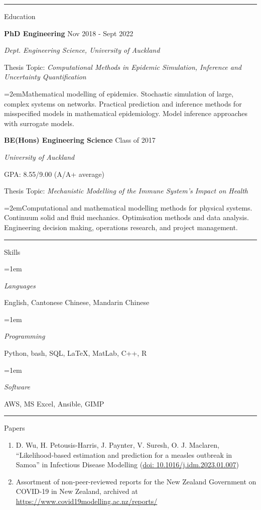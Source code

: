 \documentclass[paper=a4paper,fontsize=11pt]{scrartcl}
\newcommand{\pagerule}[1][2pt]{\noindent\rule{\textwidth}{#1}}
\newcommand{\usingfont}[2]{#1 #2 \par \normalsize \normalfont}
\newcommand{\sectionheader}[1]{\pagerule \vspace{0.05ex} \usingfont{\usefont{T1}{phv}{m}{v} \Large}{\noindent \hspace{-0.5em} #1} \vspace{0.75ex}}
\newlength{\spacebox}
\newcommand{\indented}[1][2em]{\noindent\hangindent=#1\hangafter=0}
\begin{document}
\sectionheader{Education}
\noindent \textbf{PhD Engineering} \hfill
Nov 2018 - Sept 2022 \par
\noindent \textit{Dept. Engineering Science, University of
Auckland} \par
\small Thesis Topic: \emph{Computational Methods in Epidemic Simulation,
Inference and Uncertainty Quantification} \par
\indented \small Mathematical modelling of epidemics. Stochastic
simulation of large, complex systems on networks. Practical prediction
and inference methods for misspecified models in mathematical
epidemiology. Model inference approaches with surrogate models.
\normalsize \par\par
\noindent \textbf{BE(Hons) Engineering Science} \hfill
Class of 2017 \par
\noindent \textit{University of Auckland} \par
\small GPA: 8.55/9.00 (A/A+ average) \par
\small Thesis Topic: \emph{Mechanistic Modelling of the Immune System's
Impact on Health} \par
\indented \small Computational and mathematical modelling methods for
physical systems. Continuum solid and fluid mechanics. Optimisation
methods and data analysis. Engineering decision making, operations
research, and project management.
\normalsize \par\par

\sectionheader{Skills}
\indented[1em] \parbox{\spacebox}{\textit{Languages}} 
\hspace{1.5em} English, Cantonese Chinese, Mandarin Chinese
\par
\indented[1em] \parbox{\spacebox}{\textit{Programming}} 
\hspace{1.5em} Python, bash, SQL, \LaTeX, MatLab, C++, R
\par
\indented[1em] \parbox{\spacebox}{\textit{Software}} 
\hspace{1.5em} AWS, MS Excel, Ansible, GIMP
\par

\sectionheader{Papers}
\vspace{-2ex}
\begin{enumerate}
\itemsep-0.25em
\item 
D. Wu, H. Petousis-Harris, J. Paynter, V. Suresh, O. J.
Maclaren, ``Likelihood-based estimation and prediction for a measles
outbreak in Samoa'' in Infectious Disease
Modelling (\href{https://doi.org/10.1016/j.idm.2023.01.007}{doi:
10.1016/j.idm.2023.01.007})
\item 
Assortment of non-peer-reviewed reports for the New Zealand Government
on COVID-19 in New Zealand, archived at
\url{https://www.covid19modelling.ac.nz/reports/}
\end{enumerate}
\vspace{-2ex}
\end{document}
